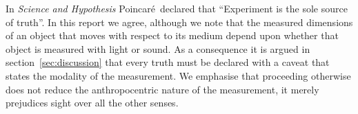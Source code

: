 \documentclass[10pt, fleqn,final,showtrims,oldfontcommands]{article} %
\newcommand{\secref}[1]{section~\ref{sec:#1}}
\newcommand{\aetherial}{\ae therial}
\newcommand{\Poincare}{Poincar{\'e}}
\begin{document}
In {\em Science and Hypothesis}\cite{Poincare1902} \Poincare\ declared that ``Experiment is the sole source of truth''.
In this report we agree, although we note that  the measured dimensions of an object that moves with respect to its medium   depend upon whether
that object is measured with light or sound.
As a consequence it is argued in \secref{discussion} that   every truth  must be declared  with a caveat that states the modality of the measurement.
We emphasise that  proceeding otherwise does not reduce the anthropocentric nature of the measurement, 
it merely prejudices sight over all the other senses.





\end{document}
